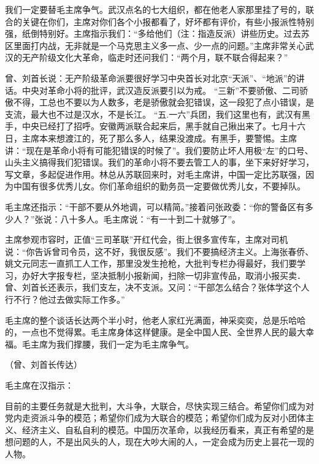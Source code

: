 我们一定要替毛主席争气。武汉点名的七大组织，都在他老人家那里挂了号的，联合的关键在你们，主席对你们各个小报都看了，好坏都有评价，有些小报派性特别强，纸倒特别好。主席指示我们：“多给他们（注：指造反派）讲些历史。过去苏区里面打内战，无非就是一个马克思主义多一点、少一点的问题。”主席非常关心武汉的无产阶级文化大革命，临走时还问我们：“两个月，联不联合得起来？”

曾、刘首长说：无产阶级革命派要很好学习中央首长对北京“天派”、“地派”的讲话。中央对革命小将的批评，武汉造反派要引以为戒。  “三新”不要骄傲、二司骄傲不得，工总也不要以为人数多，老是骄傲就会犯错误，这一段犯了点小错误，是支流，最大也不过是汉水，不是长江。 “五.一六”兵团，我们这里也有，武汉有黑手，中央已经打了招呼。安徽两派联合起来后，黑手就自己揪出来了。七月十六日，主席本来想渡江的，死了那么多人，结果没渡成。有黑手，要警惕。主席讲：“现在是革命小将有可能犯错误的时候了”。我们要防止坏人用极“左”的口号、山头主义搞得我们犯错误。我们的革命小将不要去管工人的事，坐下来好好学习，写文章，多起促进作用。林总从苏联回来时，对毛主席讲，中国一定比苏联强，因为中国有很多优秀儿女。你们革命组织的勤务员一定要做优秀儿女，不要掉队。

毛主席还指示：“干部不要从外地调，可以精简。”接着问张政委：“你的警备区有多少人？”张说：八十多人。毛主席说：“有一十到二十就够了”。

主席参观市容时，正值“三司革联”开红代会，街上很多宣传车，主席对司机说：“你告诉曾司令员，这不好，我很反感”。我们不要搞经济主义。上海张春侨、姚文元同志一直抓工人工作，那里没发生抢枪，大批判专栏办得最好，我们要学习，办好大字报专栏，坚决抵制小报新闻，扫除一切非宣传品，取消小报买卖．曾、刘首长还表示，我们支左，决不支派。又问：“干部怎么结合？张体学这个人行不行？他过去做实际工作多。”

毛主席的整个谈话长达两个半小时，他老人家红光满面，神采奕奕，总是乐哈哈的，一点也不觉得累。毛主席身体这样健康。是全中国人民、全世界人民的最大幸福。毛主席为我们撑腰，我们一定为毛主席争气。

（曾、刘首长传达）

毛主席在汉指示：

目前的主要任务就是大批判，大斗争，大联合，尽快实现三结合。希望你们成为对党内走资派斗争的模范；希望你们成为大联合的模范；希望你们成为反对小团体主义、经济主义、自私自利的模范。中国历次革命，以我经历看来，真正有希望的是想问题的人，不是出风头的人，现在大吵大闹的人，一定会成为历史上昙花一现的人物。


